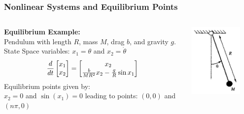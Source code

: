 \documentclass[11pt,handout]{beamer}   %
\begin{document}
\begin{frame}
\frametitle{Nonlinear Systems and Equilibrium Points}

\begin{columns}
\begin{column}{0.5\textwidth}
\textbf{Equilibrium Example:}\\
Pendulum with length $R$, mass $M$, drag $b$, and gravity $g$. State Space variables: $x_1 = \theta$ and $x_2 = \dot{\theta}$\\
\begin{equation*}
\frac{d}{dt}
\begin{bmatrix}
x_1\\x_2
\end{bmatrix} = \begin{bmatrix}
x_2\\\-\frac{b}{MR^2}x_2 - \frac{g}{R} \sin x_1
\end{bmatrix}
\end{equation*}
Equilibrium points given by:\\
\vspace{6pt}
$x_2 = 0$ and $\sin(x_1) = 0$ leading to points: $(0,0)$ and $(n\pi ,0)$
\end{column}
\begin{column}{0.5\textwidth}
\begin{center}
\includegraphics[width = 0.8\textwidth]{Figures/Fig31.PNG}
\end{center}
\end{column}
\end{columns}
\end{frame}
\end{document}
